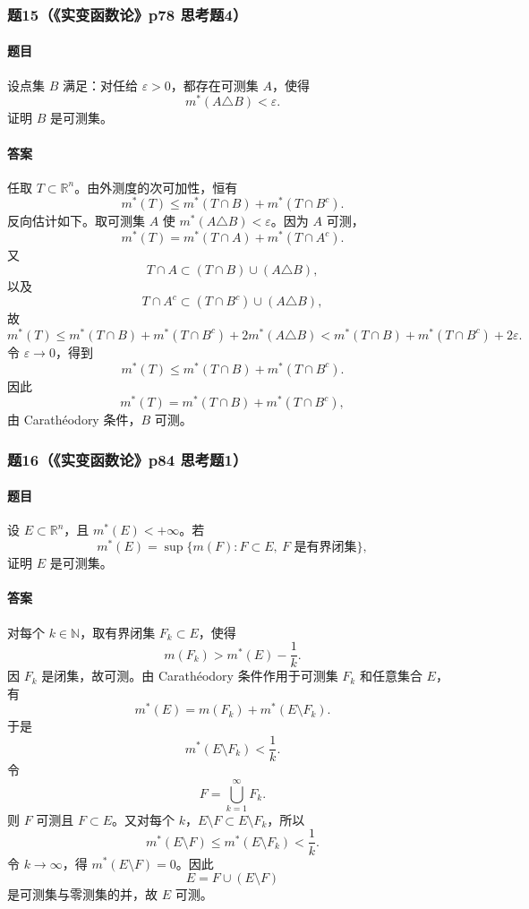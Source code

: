 \documentclass{article}
\newcommand{\R}{\mathbb{R}}
\newcommand{\N}{\mathbb{N}}
\newcommand{\eps}{\varepsilon}
\newcommand{\meas}{m}
\newcommand{\mouter}{m^*}
\begin{document}
\subsubsection*{题15（《实变函数论》p78 思考题4）}
\paragraph{题目}设点集 $B$ 满足：对任给 $\eps>0$，都存在可测集 $A$，使得
\[
\mouter(A\triangle B)<\eps.
\]
证明 $B$ 是可测集。

\paragraph{答案}任取 $T\subset\R^n$。由外测度的次可加性，恒有
\[
\mouter(T)\le \mouter(T\cap B)+\mouter(T\cap B^c).
\]
反向估计如下。取可测集 $A$ 使 $\mouter(A\triangle B)<\eps$。因为 $A$ 可测，
\[
\mouter(T)=\mouter(T\cap A)+\mouter(T\cap A^c).
\]
又
\[
T\cap A\subset (T\cap B)\cup(A\triangle B),
\]
以及
\[
T\cap A^c\subset (T\cap B^c)\cup(A\triangle B),
\]
故
\[
\mouter(T)
\le \mouter(T\cap B)+\mouter(T\cap B^c)+2\mouter(A\triangle B)
<\mouter(T\cap B)+\mouter(T\cap B^c)+2\eps.
\]
令 $\eps\to0$，得到
\[
\mouter(T)\le \mouter(T\cap B)+\mouter(T\cap B^c).
\]
因此
\[
\mouter(T)= \mouter(T\cap B)+\mouter(T\cap B^c),
\]
由 Carath\'eodory 条件，$B$ 可测。

\subsubsection*{题16（《实变函数论》p84 思考题1）}
\paragraph{题目}设 $E\subset\R^n$，且 $\mouter(E)<+\infty$。若
\[
\mouter(E)=\sup\{\meas(F):F\subset E,\ F\text{ 是有界闭集}\},
\]
证明 $E$ 是可测集。

\paragraph{答案}对每个 $k\in\N$，取有界闭集 $F_k\subset E$，使得
\[
\meas(F_k)>\mouter(E)-\frac1k.
\]
因 $F_k$ 是闭集，故可测。由 Carath\'eodory 条件作用于可测集 $F_k$ 和任意集合 $E$，有
\[
\mouter(E)=\meas(F_k)+\mouter(E\setminus F_k).
\]
于是
\[
\mouter(E\setminus F_k)<\frac1k.
\]
令
\[
F=\bigcup_{k=1}^{\infty}F_k.
\]
则 $F$ 可测且 $F\subset E$。又对每个 $k$，$E\setminus F\subset E\setminus F_k$，所以
\[
\mouter(E\setminus F)\le\mouter(E\setminus F_k)<\frac1k.
\]
令 $k\to\infty$，得 $\mouter(E\setminus F)=0$。因此
\[
E=F\cup(E\setminus F)
\]
是可测集与零测集的并，故 $E$ 可测。
\end{document}
